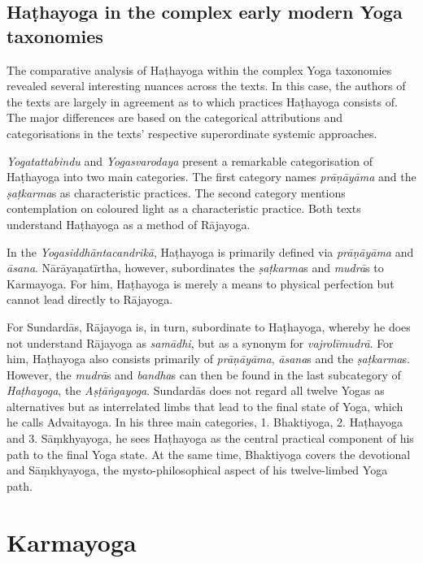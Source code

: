 \subsection{Haṭhayoga in the complex early modern Yoga taxonomies}

The comparative analysis of Haṭhayoga within the complex Yoga taxonomies revealed several interesting nuances across the texts. In this case, the authors of the texts are largely in agreement as to which practices Haṭhayoga consists of. The major differences are based on the categorical attributions and categorisations in the texts' respective superordinate systemic approaches.

\emph{Yogatattabindu} and \textit{Yogasvarodaya} present a remarkable categorisation of Haṭhayoga into two main categories. The first category names \textit{prāṇāyāma} and the \textit{ṣaṭkarma}s as characteristic practices. The second category mentions contemplation on coloured light as a characteristic practice. Both texts understand Haṭhayoga as a method of Rājayoga.

In the \textit{Yogasiddhāntacandrikā}, Haṭhayoga is primarily defined via \textit{prāṇāyāma} and \textit{āsana}. Nārāyaṇatīrtha, however, subordinates the \textit{ṣaṭkarma}s and \textit{mudrā}s to Karmayoga. For him, Haṭhayoga is merely a means to physical perfection but cannot lead directly to Rājayoga.

For Sundardās, Rājayoga is, in turn, subordinate to Haṭhayoga, whereby he does not understand Rājayoga as \textit{samādhi}, but as a synonym for \textit{vajrolīmudrā}. For him, Haṭhayoga also consists primarily of \textit{prāṇāyāma}, \textit{āsana}s and the \textit{ṣaṭkarma}s. However, the \textit{mudrā}s and \textit{bandha}s can then be found in the last subcategory of \textit{Haṭhayoga}, the \textit{Aṣṭāṅgayoga}. Sundardās does not regard all twelve Yogas as alternatives but as interrelated limbs that lead to the final state of Yoga, which he calls Advaitayoga. In his three main categories, 1. Bhaktiyoga, 2. Haṭhayoga and 3. Sāṃkhyayoga, he sees Haṭhayoga as the central practical component of his path to the final Yoga state. At the same time, Bhaktiyoga covers the devotional and Sāṃkhyayoga, the mysto-philosophical aspect of his twelve-limbed Yoga path. 

\section{Karmayoga}
\label{karmayogaintro}

